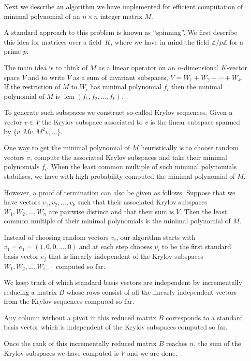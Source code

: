 \documentclass{sig-alternate-05-2015}
\DeclareMathOperator{\lcm}{lcm}
\begin{document}
Next we describe an algorithm we have implemented for efficient
computation of minimal polynomial of an $n\times n$ integer matrix $M$.

A standard approach to this problem is known as ``spinning''. 
We first describe this idea for matrices over a field~$K$, where we have
in mind the field $\mathbb{Z}/p\mathbb{Z}$ for a prime $p$.

The main idea is to think of $M$ as a linear operator on an $n$-dimensional
$K$-vector space $V$ and to write $V$ as a sum of invariant subspaces, 
$V = W_1 + W_2 + \cdots + W_k$. If the restriction of $M$ to $W_i$ has
minimal polynomial $f_i$ then the minimal polynomial of $M$ is
$\lcm(f_1, f_2, \ldots, f_k)$.

To generate such subspaces we construct so-called Krylov sequences. Given
a vector $v \in V$ the Krylov subspace associated to $v$ is the linear
subspace spanned by $\{v, Mv, M^2v, \ldots\}$.

One way to get the minimal polynomial of $M$ heuristically is to choose
random vectors $v$, compute the associated Krylov subspaces and take their
minimal polynomials $f_i$. When the least common multiple of such minimal
polynomials stabilises, we have with high probability computed the minimal
polynomial of $M$.

However, a proof of termination can also be given as follows. Suppose that
we have vectors $v_1, v_2, \ldots, v_k$ such that their associated Krylov
subspaces $W_1, W_2, \ldots, W_n$ are pairwise distinct and that their
sum is $V$. Then the least common multiple of their minimal polynomials is
the minimal polynomial of $M$.

Instead of choosing random vectors $v_i$, our algorithm starts with
$v_1 = e_1 = (1, 0, 0, \ldots, 0)$ and at each step chooses $v_i$ to be
the first standard basis vector $e_j$ that is linearly independent of the
Krylov subspaces $W_1, W_2, \ldots, W_{i-1}$ computed so far.

We keep track of which standard basis vectors are independent by
incrementally reducing a matrix $B$ whose rows consist of all the
linearly independent vectors from the Krylov sequences computed so
far.

Any column without a pivot in this reduced matrix $B$ corresponds to a
standard basis vector which is independent of the Krylov subspaces
computed so far.

Once the rank of this incrementally reduced matrix $B$ reaches $n$, the sum
of the Krylov subspaces we have computed is $V$ and we are done.
\end{document}
